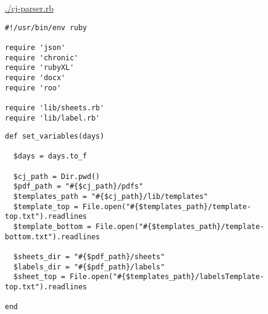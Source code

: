 \documentclass[11pt]{article}
\begin{document}
\url{./cj-parser.rb}

\begin{verbatim}
#!/usr/bin/env ruby

require 'json'
require 'chronic'
require 'rubyXL'
require 'docx'
require 'roo'

require 'lib/sheets.rb'
require 'lib/label.rb'
\end{verbatim}

\begin{verbatim}
def set_variables(days)

  $days = days.to_f

  $cj_path = Dir.pwd()
  $pdf_path = "#{$cj_path}/pdfs"
  $templates_path = "#{$cj_path}/lib/templates"
  $template_top = File.open("#{$templates_path}/template-top.txt").readlines
  $template_bottom = File.open("#{$templates_path}/template-bottom.txt").readlines

  $sheets_dir = "#{$pdf_path}/sheets"
  $labels_dir = "#{$pdf_path}/labels"
  $sheet_top = File.open("#{$templates_path}/labelsTemplate-top.txt").readlines

end
\end{verbatim}
\end{document}

